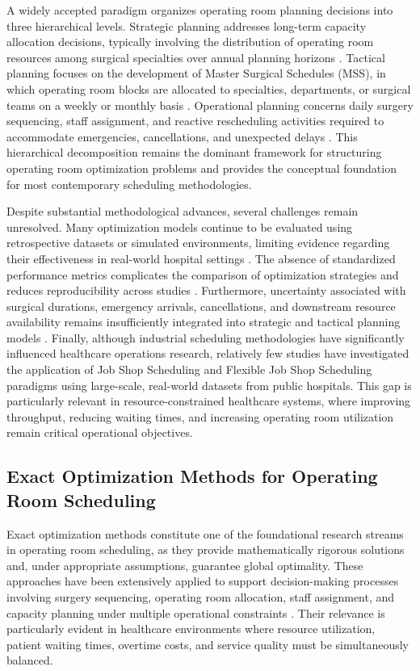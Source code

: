 \documentclass[sn-mathphys-num]{sn-jnl}
\begin{document}
    A widely accepted paradigm organizes operating room planning decisions into three hierarchical levels. Strategic planning addresses long-term capacity allocation decisions, typically involving the distribution of operating room resources among surgical specialties over annual planning horizons \cite{taylor2023}. Tactical planning focuses on the development of Master Surgical Schedules (MSS), in which operating room blocks are allocated to specialties, departments, or surgical teams on a weekly or monthly basis \cite{jittamai2025,eshghali2024}. Operational planning concerns daily surgery sequencing, staff assignment, and reactive rescheduling activities required to accommodate emergencies, cancellations, and unexpected delays \cite{zhao2025optimizing,eshghali2024,tsang2025}. This hierarchical decomposition remains the dominant framework for structuring operating room optimization problems and provides the conceptual foundation for most contemporary scheduling methodologies.
    
    Despite substantial methodological advances, several challenges remain unresolved. Many optimization models continue to be evaluated using retrospective datasets or simulated environments, limiting evidence regarding their effectiveness in real-world hospital settings \cite{chamarthi2025,bellini2020}. The absence of standardized performance metrics complicates the comparison of optimization strategies and reduces reproducibility across studies \cite{schouten2023}. Furthermore, uncertainty associated with surgical durations, emergency arrivals, cancellations, and downstream resource availability remains insufficiently integrated into strategic and tactical planning models \cite{cardoen2010,al-amin2024}. Finally, although industrial scheduling methodologies have significantly influenced healthcare operations research, relatively few studies have investigated the application of Job Shop Scheduling and Flexible Job Shop Scheduling paradigms using large-scale, real-world datasets from public hospitals. This gap is particularly relevant in resource-constrained healthcare systems, where improving throughput, reducing waiting times, and increasing operating room utilization remain critical operational objectives.

    \subsection*{Exact Optimization Methods for Operating Room Scheduling}

    Exact optimization methods constitute one of the foundational research streams in operating room scheduling, as they provide mathematically rigorous solutions and, under appropriate assumptions, guarantee global optimality. These approaches have been extensively applied to support decision-making processes involving surgery sequencing, operating room allocation, staff assignment, and capacity planning under multiple operational constraints \cite{cardoen2010_review,al-amin2024}. Their relevance is particularly evident in healthcare environments where resource utilization, patient waiting times, overtime costs, and service quality must be simultaneously balanced.
    
\end{document}
